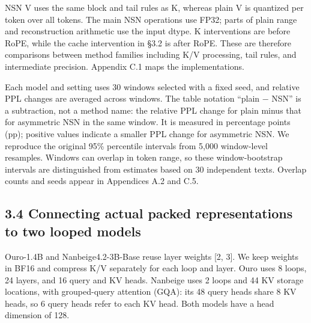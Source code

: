 \documentclass[10pt,a4paper]{article}
\begin{document}
NSN V uses the same block and tail rules as K, whereas plain V is quantized per token over all tokens. The main NSN operations use FP32; parts of plain range and reconstruction arithmetic use the input dtype. K interventions are before RoPE, while the cache intervention in §3.2 is after RoPE. These are therefore comparisons between method families including K/V processing, tail rules, and intermediate precision. Appendix C.1 maps the implementations.

Each model and setting uses 30 windows selected with a fixed seed, and relative PPL changes are averaged across windows. The table notation ``plain − NSN'' is a subtraction, not a method name: the relative PPL change for plain minus that for asymmetric NSN in the same window. It is measured in percentage points (pp); positive values indicate a smaller PPL change for asymmetric NSN. We reproduce the original 95\% percentile intervals from 5,000 window-level resamples. Windows can overlap in token range, so these window-bootstrap intervals are distinguished from estimates based on 30 independent texts. Overlap counts and seeds appear in Appendices A.2 and C.5.

\subsection{3.4 Connecting actual packed representations to two looped models}\label{connecting-actual-packed-representations-to-two-looped-models}

Ouro-1.4B and Nanbeige4.2-3B-Base reuse layer weights {[}2, 3{]}. We keep weights in BF16 and compress K/V separately for each loop and layer. Ouro uses 8 loops, 24 layers, and 16 query and KV heads. Nanbeige uses 2 loops and 44 KV storage locations, with grouped-query attention (GQA): its 48 query heads share 8 KV heads, so 6 query heads refer to each KV head. Both models have a head dimension of 128.
\end{document}
